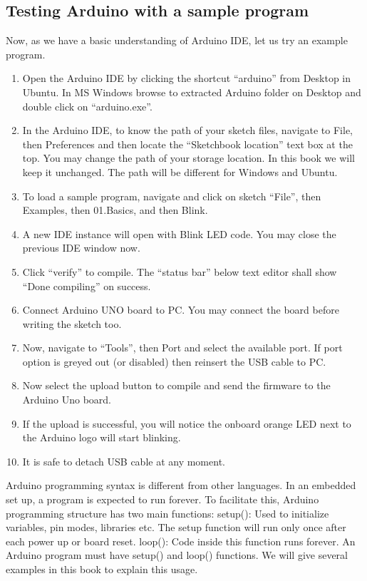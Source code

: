 \subsection{Testing Arduino with a sample program}
\label{sec:testing-arduino}
Now, as we have a basic understanding of Arduino IDE, let us try an
example program.
\begin{enumerate}
      \item Open the Arduino IDE by clicking the shortcut ``arduino'' from
            Desktop in Ubuntu. In MS Windows browse to extracted Arduino folder
            on Desktop and double click on ``arduino.exe''.
      \item In the Arduino IDE, to know the path of your sketch files,
            navigate to File, then Preferences and then locate the ``Sketchbook
            location'' text box at the top.  You may change the path of your
            storage location. In this book we will keep it unchanged. The path
            will be different for Windows and Ubuntu.
      \item To load a sample program, navigate and click on sketch ``File'',
            then Examples, then 01.Basics, and then Blink.
      \item A new IDE instance will open with Blink LED code.  You may close
            the previous IDE window now.
      \item Click ``verify'' to compile. The ``status bar'' below text editor
            shall show ``Done compiling'' on success.
      \item Connect Arduino UNO board to PC. You may connect the board
            before writing the sketch too.
      \item Now, navigate to ``Tools'', then Port and select the available
            port. If port option is greyed out (or disabled) then reinsert the
            USB cable to PC.
      \item Now select the upload button to compile and send the firmware to
            the Arduino Uno board.
      \item If the upload is successful, you will notice the onboard orange LED
            next to the Arduino logo will start blinking.
      \item It is safe to detach USB cable at any moment.
\end{enumerate}

Arduino programming syntax is different from other languages. In an
embedded set up, a program is expected to run forever. To facilitate
this, Arduino programming structure has two main functions: setup():
Used to initialize variables, pin modes, libraries etc. The setup
function will run only once after each power up or board reset.
loop(): Code inside this function runs forever. An Arduino program
must have setup() and loop() functions.  We will give several examples
in this book to explain this usage.

